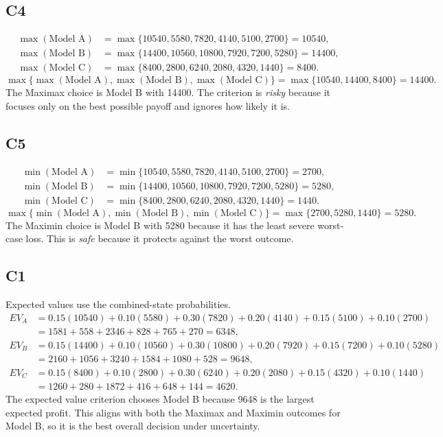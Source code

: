 \begin{ExamProblems}
		\subsection*{C4}
		\[
		\begin{aligned}
		\max(\text{Model A}) &= \max\{10540,5580,7820,4140,5100,2700\} = 10540,\\
		\max(\text{Model B}) &= \max\{14400,10560,10800,7920,7200,5280\} = 14400,\\
		\max(\text{Model C}) &= \max\{8400,2800,6240,2080,4320,1440\} = 8400.
		\end{aligned}
		\]
		\[
		\max\{\max(\text{Model A}), \max(\text{Model B}), \max(\text{Model C})\}
		= \max\{10540, 14400, 8400\}
		= 14400.
		\]
		The Maximax choice is Model B with 14400. The criterion is \emph{risky} because it focuses only on the best possible payoff and ignores how likely it is.

		\subsection*{C5}
		\[
		\begin{aligned}
		\min(\text{Model A}) &= \min\{10540,5580,7820,4140,5100,2700\} = 2700,\\
		\min(\text{Model B}) &= \min\{14400,10560,10800,7920,7200,5280\} = 5280,\\
		\min(\text{Model C}) &= \min\{8400,2800,6240,2080,4320,1440\} = 1440.
		\end{aligned}
		\]
		\[
		\max\{\min(\text{Model A}), \min(\text{Model B}), \min(\text{Model C})\}
		= \max\{2700, 5280, 1440\}
		= 5280.
		\]
		The Maximin choice is Model B with 5280 because it has the least severe worst-case loss. This is \emph{safe} because it protects against the worst outcome.

		\subsection*{C1}
		Expected values use the combined-state probabilities.
		\[
		\begin{aligned}
		EV_A &= 0.15(10540)+0.10(5580)+0.30(7820)+0.20(4140)+0.15(5100)+0.10(2700)\\
		&= 1581+558+2346+828+765+270=6348,\\
		EV_B &= 0.15(14400)+0.10(10560)+0.30(10800)+0.20(7920)+0.15(7200)+0.10(5280)\\
		&= 2160+1056+3240+1584+1080+528=9648,\\
		EV_C &= 0.15(8400)+0.10(2800)+0.30(6240)+0.20(2080)+0.15(4320)+0.10(1440)\\
		&= 1260+280+1872+416+648+144=4620.
		\end{aligned}
		\]
		The expected value criterion chooses Model B because 9648 is the largest expected profit. This aligns with both the Maximax and Maximin outcomes for Model B, so it is the best overall decision under uncertainty.
	\end{ExamProblems}


